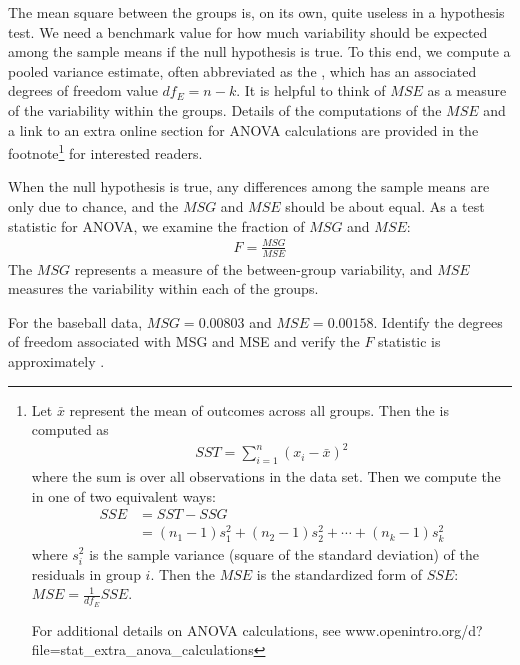 The mean square between the groups is, on its own, quite useless in a hypothesis test. We need a benchmark value for how much variability should be expected among the sample means if the null hypothesis is true. To this end, we compute a pooled variance estimate, often abbreviated as the , which has an associated degrees of freedom value $df_E=n-k$. It is helpful to think of $MSE$ as a measure of the variability within the groups.
Details of the computations of the $MSE$ and a link to an
extra online section for ANOVA calculations are provided
in the footnote\footnote{Let $\bar{x}$ represent the mean
  of outcomes across all groups.
  Then the  is computed as
  \begin{align*}
  SST = \sum_{i=1}^{n} \left(x_{i} - \bar{x}\right)^2
  \end{align*}
  where the sum is over all observations in the data set.
  Then we compute the 
  in one of two equivalent ways:
  \begin{align*}
  SSE &= SST - SSG \\
  	&= (n_1-1)s_1^2 + (n_2-1)s_2^2 + \cdots + (n_k-1)s_k^2
  \end{align*}
  where $s_i^2$ is the sample variance (square of the standard
  deviation) of the residuals in group $i$.
  Then the $MSE$ is the standardized form of $SSE$:
  $MSE = \frac{1}{df_{E}}SSE$.
  
  \noindent%
  For additional details on ANOVA calculations, see
      {www.openintro.org/d?file=stat\_extra\_anova\_calculations}}
for interested readers.

When the null hypothesis is true, any differences among the sample means are only due to chance, and the $MSG$ and $MSE$ should be about equal. As a test statistic for ANOVA, we examine the fraction of $MSG$ and $MSE$:
\begin{align*}
F = \frac{MSG}{MSE}
\end{align*}
The $MSG$ represents a measure of the between-group variability, and $MSE$ measures the variability within each of the groups.

\begin{exercisewrap}
\begin{nexercise}
For the baseball data, $MSG = 0.00803$ and $MSE=0.00158$.
Identify the degrees of freedom associated with MSG and
MSE and verify the $F$ statistic is approximately
\mlbF{}.\footnotemark{}
\end{nexercise}
\end{exercisewrap}

